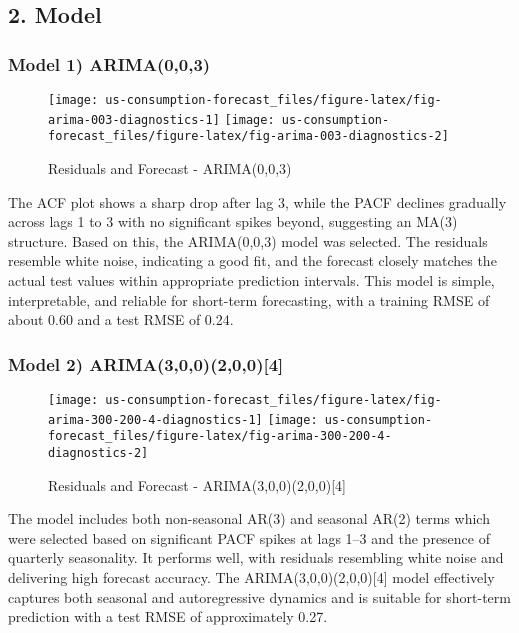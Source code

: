 \documentclass[
  12pt,
]{article}
\begin{document}
\hypertarget{model}{%
\subsection{2. Model}\label{model}}

\hypertarget{model-1-arima003}{%
\subsubsection{Model 1) ARIMA(0,0,3)}\label{model-1-arima003}}

\begin{figure}
\texttt{[image: us-consumption-forecast\_files/figure-latex/fig-arima-003-diagnostics-1]} \texttt{[image: us-consumption-forecast\_files/figure-latex/fig-arima-003-diagnostics-2]} \caption{Residuals and Forecast - ARIMA(0,0,3)}\label{fig:fig-arima-003-diagnostics}
\end{figure}

The ACF plot shows a sharp drop after lag 3, while the PACF declines
gradually across lags 1 to 3 with no significant spikes beyond,
suggesting an MA(3) structure. Based on this, the ARIMA(0,0,3) model was
selected. The residuals resemble white noise, indicating a good fit, and
the forecast closely matches the actual test values within appropriate
prediction intervals. This model is simple, interpretable, and reliable
for short-term forecasting, with a training RMSE of about 0.60 and a
test RMSE of 0.24.

\hypertarget{model-2-arima3002004}{%
\subsubsection{Model 2)
ARIMA(3,0,0)(2,0,0){[}4{]}}\label{model-2-arima3002004}}

\begin{figure}
\texttt{[image: us-consumption-forecast\_files/figure-latex/fig-arima-300-200-4-diagnostics-1]} \texttt{[image: us-consumption-forecast\_files/figure-latex/fig-arima-300-200-4-diagnostics-2]} \caption{Residuals and Forecast - ARIMA(3,0,0)(2,0,0)[4]}\label{fig:fig-arima-300-200-4-diagnostics}
\end{figure}

The model includes both non-seasonal AR(3) and seasonal AR(2) terms
which were selected based on significant PACF spikes at lags 1--3 and
the presence of quarterly seasonality. It performs well, with residuals
resembling white noise and delivering high forecast accuracy. The
ARIMA(3,0,0)(2,0,0){[}4{]} model effectively captures both seasonal and
autoregressive dynamics and is suitable for short-term prediction with a
test RMSE of approximately 0.27.
\end{document}
